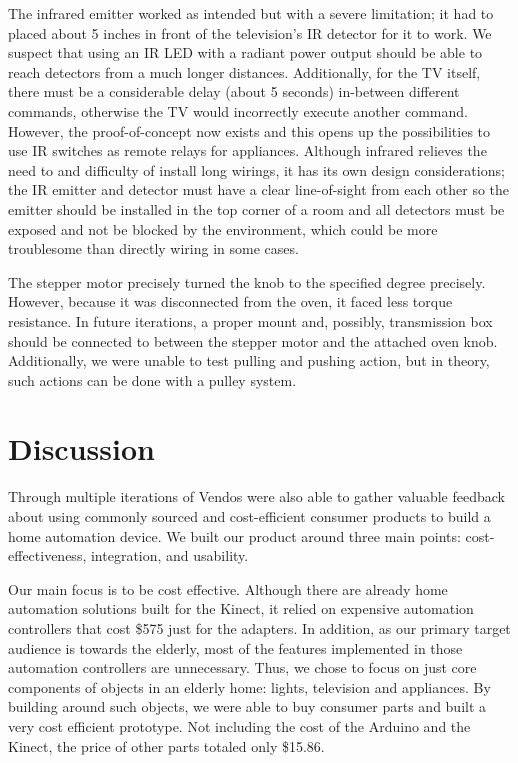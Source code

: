 \documentclass{chi-ext}
\begin{document}
The infrared emitter worked as intended but with a severe limitation;
it had to placed about 5 inches in front of the television's IR detector for it to work.
We suspect that using an IR LED with a radiant power output should be able to reach detectors from a much longer distances.
Additionally, for the TV itself, there must be a considerable delay (about 5 seconds) in-between different commands, otherwise the TV would incorrectly execute another command.
However, the proof-of-concept now exists and this opens up the possibilities to use IR switches as remote relays for appliances.
Although infrared relieves the need to and difficulty of install long wirings, it has its own design considerations;
the IR emitter and detector must have a clear line-of-sight from each other so the emitter should be installed in the top corner of a room and all detectors must be exposed and not be blocked by the environment, which could be more troublesome than directly wiring in some cases.

The stepper motor precisely turned the knob to the specified degree precisely.
However, because it was disconnected from the oven, it faced less torque resistance.
In future iterations, a proper mount and, possibly, transmission box should be connected to between the stepper motor and the attached oven knob.
Additionally, we were unable to test pulling and pushing action, but in theory, such actions can be done with a pulley system.

\section{Discussion}

Through multiple iterations of Vendos were also able to gather valuable feedback about using commonly sourced and cost-efficient consumer products to build a home automation device.
We built our product around three main points: cost-effectiveness, integration, and usability.
 
Our main focus is to be cost effective.
Although there are already home automation solutions built for the Kinect, it relied on expensive automation controllers that cost \$575 \cite{_nitrogen} just for the adapters.
In addition, as our primary target audience is towards the elderly, most of the features implemented in those automation controllers are unnecessary.
Thus, we chose to focus on just core components of objects in an elderly home: lights, television and appliances.
By building around such objects, we were able to buy consumer parts and built a very cost efficient prototype.
Not including the cost of the Arduino and the Kinect, the price of other parts totaled only \$15.86.
\end{document}
